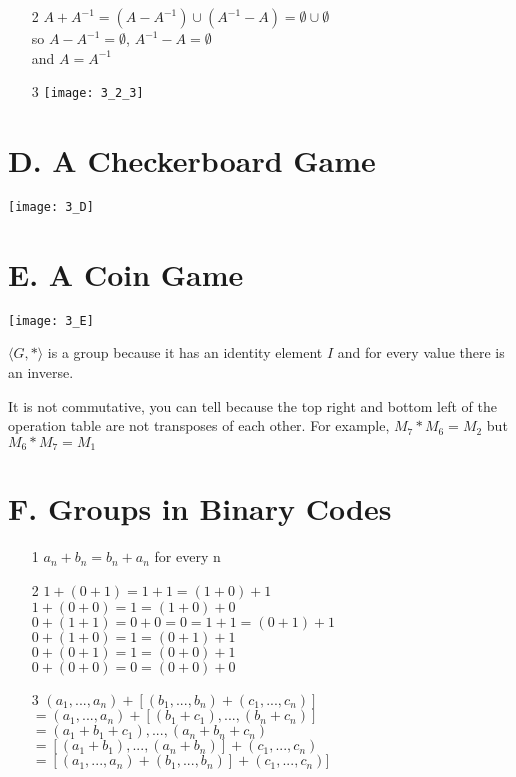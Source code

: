\begin{enumerate}
\begin{enumerate}
\item[2]
$A+A^{-1}=(A-A^{-1}) \cup (A^{-1}-A)=\emptyset \cup \emptyset$ \\
so $A-A^{-1}=\emptyset$,  $A^{-1}-A=\emptyset$ \\
and $A=A^{-1}$

\item[3]
\texttt{[image: 3\_2\_3]}

\end{enumerate}

\section*{D. A Checkerboard Game}

\texttt{[image: 3\_D]}

\section*{E. A Coin Game}

\texttt{[image: 3\_E]}

$\langle G, * \rangle$ is a group because it has an identity element $I$ and for every value there is an inverse.

It is not commutative, you can tell because the top right and bottom left of the operation table are not transposes of each other. For example, $M_{7}*M_{6}=M_{2}$ but  $M_{6}*M_{7}=M_{1}$

\section*{F. Groups in Binary Codes}

\begin{enumerate}

\item[1]
$a_{n}+b_{n}=b_{n}+a_{n}$ for every n \\

\item[2]
$1+(0+1)=1+1=(1+0)+1$ \\
$1+(0+0)=1=(1+0)+0$ \\
$0+(1+1)=0+0=0=1+1=(0+1)+1$ \\
$0+(1+0)=1=(0+1)+1$ \\
$0+(0+1)=1=(0+0)+1$ \\
$0+(0+0)=0=(0+0)+0$ \\

\item[3]
$(a_1,...,a_n)+[(b_1,...,b_n)+(c_1,...,c_n)]$ \\
$=(a_1,...,a_n)+[(b_1+c_1),...,(b_n+c_n)]$ \\
$=(a_1+b_1+c_1),...,(a_n+b_n+c_n)$ \\
$=[(a_1+b_1),...,(a_n+b_n)]+(c_1,...,c_n)$ \\
$=[(a_1,...,a_n)+(b_1,...,b_n)]+(c_1,...,c_n)]$ \\


\end{enumerate}
\end{enumerate}

